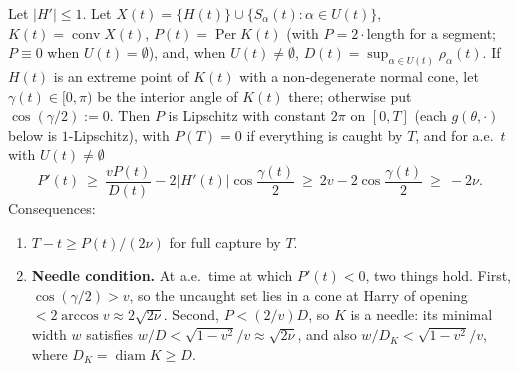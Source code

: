 \begin{lemma}\label{lem:G5}
Let $|H'|\le1$. Let $X(t)=\{H(t)\}\cup\{S_\alpha(t):\alpha\in U(t)\}$, $K(t)=\operatorname{conv}X(t)$, $P(t)=\operatorname{Per}K(t)$ (with
$P=2\cdot$length for a segment; $P\equiv0$ when $U(t)=\emptyset$), and, when $U(t)\neq\emptyset$, $D(t)=\sup_{\alpha\in U(t)}\rho_\alpha(t)$. If $H(t)$ is an extreme point
of $K(t)$ with a non-degenerate normal cone, let $\gamma(t)\in[0,\pi)$ be the interior angle of $K(t)$ there; otherwise put
$\cos(\gamma/2):=0$. Then $P$ is Lipschitz with constant $2\pi$ on $[0,T]$ (each $g(\theta,\cdot)$ below is $1$-Lipschitz), with
$P(T)=0$ if everything is caught by $T$, and for a.e.\ $t$ with $U(t)\neq\emptyset$
\begin{equation}\label{eq:G5}
P'(t)\ \ge\ \frac{vP(t)}{D(t)}-2|H'(t)|\cos\frac{\gamma(t)}2\ \ge\ 2v-2\cos\frac{\gamma(t)}2\ \ge\ -2\nu .
\end{equation}
Consequences:
\begin{enumerate}
\item[(i)] $T-t\ge P(t)/(2\nu)$ for full capture by $T$.
\item[(ii)] \textbf{Needle condition.} At a.e.\ time at which $P'(t)<0$, two things hold. First, $\cos(\gamma/2)>v$, so the uncaught
set lies in a cone at Harry of opening $<2\arccos v\approx2\sqrt{2\nu}$. Second, $P<(2/v)D$, so $K$ is a needle: its minimal width
$w$ satisfies $w/D<\sqrt{1-v^2}/v\approx\sqrt{2\nu}$, and also $w/D_K<\sqrt{1-v^2}/v$, where $D_K=\operatorname{diam}K\ge D$.
\end{enumerate}
\end{lemma}
